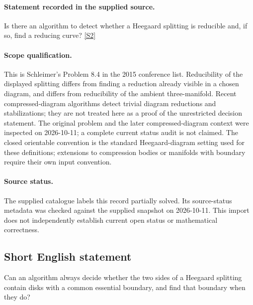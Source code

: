 \documentclass[11pt]{article}
\begin{document}
\paragraph{Statement recorded in the supplied source.}
Is there an algorithm to detect whether a Heegaard splitting is reducible and, if so, find a reducing curve? \href{https://arxiv.org/pdf/1512.04620#page=6}{[S2]}
\paragraph{Scope qualification.}
This is Schleimer's Problem 8.4 in the 2015 conference list. Reducibility of the displayed splitting differs from finding a reduction already visible in a chosen diagram, and differs from reducibility of the ambient three-manifold. Recent compressed-diagram algorithms detect trivial diagram reductions and stabilizations; they are not treated here as a proof of the unrestricted decision statement. The original problem and the later compressed-diagram context were inspected on 2026-10-11; a complete current status audit is not claimed. The closed orientable convention is the standard Heegaard-diagram setting used for these definitions; extensions to compression bodies or manifolds with boundary require their own input convention.
\paragraph{Source status.}
The supplied catalogue labels this record partially solved. Its source-status metadata was checked against the supplied snapshot on 2026-10-11. This import does not independently establish current open status or mathematical correctness.
\subsection{Short English statement}
Can an algorithm always decide whether the two sides of a Heegaard splitting contain disks with a common essential boundary, and find that boundary when they do?
\end{document}
